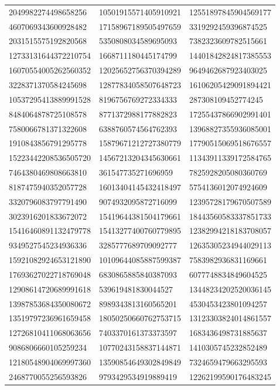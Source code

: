\begin{longtable}{*{3}{l}}
2049982274498658256&10501915571405910921&12551897845904569177\\
4607069343600928482&17158967189505497659&3319292459396874525\\
2031515575192820568&5350808034589695093&7382323609782515661\\
12733131644372210754&1668711180445174799&14401842824817385553\\
16070554005262560352&12025652756370394289&9649462687923403025\\
3228371370584245698&12877834058507648723&16106205429091894421\\
10537295413889991528&8196756769272334333&287308109452774245\\
8484064878725108578&8771372988177882823&17255437866902991401\\
7580066781371322608&6388760574564762393&13968827355936085001\\
1910843856791295778&15879671212727380779&17790515069518676557\\
15223442208536505720&14567213204345630661&11343911339172584765\\
7464380469808663810&361547735271696959&7825928205080360769\\
8187475940352057728&16013404145432418497&5754136012074924609\\
3320796083797791490&9074932095872716099&12395728179670507589\\
3023916201833672072&15419644381504179661&18443560583337851733\\
15416460891132479778&15413277400760779895&12382994218183708057\\
9349527545234936336&3285777689709092777&12635305234944029113\\
15921082924653121890&10109644085887599387&7583982936831169661\\
17693627022718769048&6830865885840387093&6077748834849604525\\
12908614720689991618&539619481830044527&13448234202520036145\\
13987853684350080672&8989343813160565201&4530453423801094257\\
13519797236961659458&18050250660762753715&13123303824014861557\\
12726810411068063656&7403370161373373597&1683436498731885637\\
9086806660105259234&10770243158837144871&1410305745232852489\\
12180548904069997360&13590854649302849849&7324659479663295593\\
2468770055256593826&9793429534919889419&12262199590176483245\\

\end{longtable}
